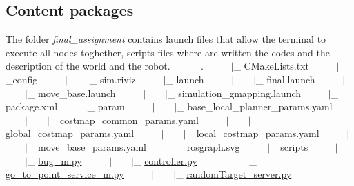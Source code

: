 \subsection*{Content packages}

The folder {\itshape final\+\_\+assignment} contains launch files that allow the terminal to execute all nodes toghether, scripts files where are written the codes and the description of the world and the robot. ~\newline
~~~~.~\newline
 ~~~~$\vert$\+\_\+ C\+Make\+Lists.\+txt~\newline
 ~~~~$\vert$\+\_\+config~\newline
 ~~~~$\vert$~~~~$\vert$\+\_\+ sim.\+riviz~\newline
 ~~~~$\vert$\+\_\+ launch~\newline
 ~~~~$\vert$~~~~$\vert$\+\_\+ final.\+launch~\newline
 ~~~~$\vert$~~~~$\vert$\+\_\+ move\+\_\+base.\+launch~\newline
 ~~~~$\vert$~~~~$\vert$\+\_\+ simulation\+\_\+gmapping.\+launch~\newline
 ~~~~$\vert$\+\_\+ package.\+xml~\newline
 ~~~~$\vert$\+\_\+ param~\newline
 ~~~~$\vert$~~~~$\vert$\+\_\+ base\+\_\+local\+\_\+planner\+\_\+params.\+yaml~\newline
 ~~~~$\vert$~~~~$\vert$\+\_\+ costmap\+\_\+common\+\_\+params.\+yaml~\newline
 ~~~~$\vert$~~~~$\vert$\+\_\+ global\+\_\+costmap\+\_\+params.\+yaml~\newline
 ~~~~$\vert$~~~~$\vert$\+\_\+ local\+\_\+costmap\+\_\+params.\+yaml~\newline
 ~~~~$\vert$~~~~$\vert$\+\_\+ move\+\_\+base\+\_\+params.\+yaml~\newline
 ~~~~$\vert$\+\_\+ rosgraph.\+svg~\newline
 ~~~~$\vert$\+\_\+ scripts~\newline
 ~~~~$\vert$~~~~$\vert$\+\_\+ \hyperlink{bug__m_8py}{bug\+\_\+m.\+py}~\newline
 ~~~~$\vert$~~~~$\vert$\+\_\+ \hyperlink{controller_8py}{controller.\+py}~\newline
 ~~~~$\vert$~~~~$\vert$\+\_\+ \hyperlink{go__to__point__service__m_8py}{go\+\_\+to\+\_\+point\+\_\+service\+\_\+m.\+py}~\newline
 ~~~~$\vert$~~~~$\vert$\+\_\+ \hyperlink{random_target__server_8py}{random\+Target\+\_\+server.\+py}~\newline
